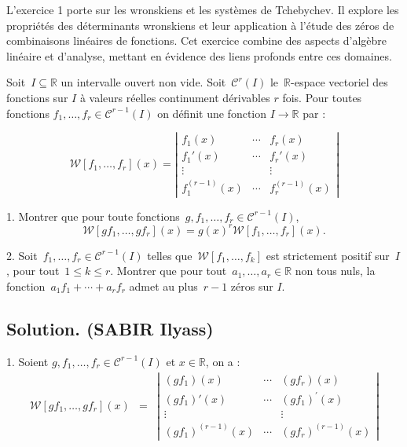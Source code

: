 L'exercice 1 porte sur les wronskiens et les syst{\`e}mes de Tchebychev. Il explore les propri{\'e}t{\'e}s des d{\'e}terminants wronskiens et leur application {\`a} l'{\'e}tude des z{\'e}ros de combinaisons lin{\'e}aires de fonctions. Cet exercice combine des aspects d'alg{\`e}bre lin{\'e}aire et d'analyse, mettant en {\'e}vidence des liens profonds entre ces domaines.

\begin{exercise}

Soit~$I \subseteq \mathbb{R}$ un intervalle ouvert non vide.
Soit~$\mathcal{C}^r (I)$ le~$\mathbb{R}$-espace vectoriel des fonctions sur $I$ {\`a} valeurs r{\'e}elles continument d{\'e}rivables $r$ fois. Pour toutes fonctions $f_1, \ldots, f_r \in \mathcal{C}^{r - 1} (I)$ on d{\'e}finit une fonction $I \to \mathbb{R}$ par :

\[ \mathcal{W} [f_1, \ldots, f_r] (x) = \left| \begin{array}{ccc}
     f_1 (x) & \cdots & f_r (x)\\
     f_1' (x) & \cdots & f_r' (x)\\
     \vdots &  & \vdots\\
     f_1^{(r - 1)} (x) & \cdots & f_r^{(r - 1)} (x)
   \end{array} \right| \]


1. Montrer que pour toute fonctions~$g, f_1, \ldots, f_r \in \mathcal{C}^{r - 1} (I)$,
\[ \mathcal{W} [gf_1, \ldots, gf_r] (x) = g (x)^r \mathcal{W} [f_1, \ldots, f_r] (x) . \]

2. Soit~$f_1, \ldots, f_r \in \mathcal{C}^{r - 1} (I)$ telles que~$\mathcal{W}
[f_1, \ldots, f_k]$ est strictement positif sur~$I$, pour tout~$1 \leq k \leq r$. Montrer que pour tout~$a_1, \ldots, a_r \in \mathbb{R}$ non tous nuls, la fonction~$a_1 f_1 + \cdots + a_r f_r$ admet au plus~$r - 1$ z{\'e}ros sur $I$.
\end{exercise}

\subsection*{Solution. (SABIR Ilyass)}

1. Soient $g, f_1, \ldots, f_r \in \mathcal{C}^{r - 1} (I)$ et $x \in
\mathbb{R}$, on a :
\begin{eqnarray*}
  \mathcal{W} [gf_1, \ldots, gf_r] (x) & = & \left| \begin{array}{ccc}
    (g f_1) (x) & \cdots & (g f_r) (x)\\
    (g f_1)' (x) & \cdots & (g f_1)^{'} (x)\\
    \vdots &  & \vdots\\
    (g f_1)^{(r - 1)} (x) & \cdots & (g f_r)^{(r - 1)} (x)
  \end{array} \right|
\end{eqnarray*}

